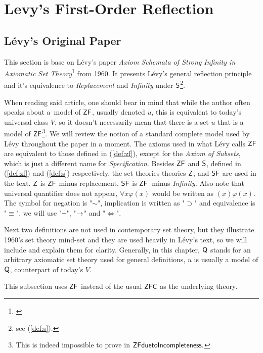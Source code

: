 \section{Levy's First-Order Reflection}\label{sec:first_order}

\subsection{Lévy's Original Paper}\label{sec:levy1960}
This section is base on Lévy's paper \emph{Axiom Schemata of Strong Infinity in Axiomatic Set Theory}\footnote{\cite{Levy60a}} from 1960. It presents Lévy's general reflection principle and it's equivalence to \emph{Replacement} and \emph{Infinity} under $\sf{S}$\footnote{see (\ref{def:s}).}.

When reading said article, one should bear in mind that while the author often speaks about a~model of $\sf{ZF}$, usually denoted $u$, this is equivalent to today's universal class $V$, so it doesn't necessarily mean that there is a set $u$ that is a model of $\sf{ZF}$\footnote{This is indeed impossible to prove in $\sf{ZF} due to Incompleteness.$}. We will review the notion of a standard complete model used by Lévy throughout the paper in a moment.
The axioms used in what Lévy calls $\sf{ZF}$ are equivalent to those defined in (\ref{def:zf}), except for the \emph{Axiom of Subsets}, which is just a different name for \emph{Specification}.
Besides $\sf{ZF}$ and $\sf{S}$, defined in (\ref{def:zf}) and (\ref{def:s}) respectively, the set theories theories $\sf{Z}$, and $\sf{SF}$ are used in the text. $\sf{Z}$ is $\sf{ZF}$ minus replacement, $\sf{SF}$ is $\sf{ZF}$ minus \emph{Infinity}. Also note that universal quantifier does not appear, $\forall x \varphi (x)$ would be written as $(x) \varphi (x)$. The symbol for negation is "$\sim$", implication is written as "$\supset$" and equivalence is "$\equiv$", we will use "$\neg$", "$\rightarrow$" and "$\iff$".

Next two definitions are not used in contemporary set theory, but they illustrate 1960's set theory mind-set and they are used heavily in Lévy's text, so we will include and explain them for clarity. Generally, in this chapter, $\sf{Q}$ stands for an arbitrary axiomatic set theory used for general definitions, $u$ is usually a model of $\sf{Q}$, counterpart of today's $V$.

This subsection uses $\sf{ZF}$ instead of the usual $\sf{ZFC}$ as the underlying theory.

